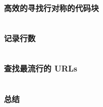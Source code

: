 \documentclass[./main.tex]{subfiles}
\begin{document}
%

\begin{lstlisting}[language=Haskell]

\end{lstlisting}



\begin{lstlisting}[language=Haskell]

\end{lstlisting}

\subsubsection*{高效的寻找行对称的代码块}


\begin{lstlisting}[language=Haskell]

\end{lstlisting}

\subsubsection*{记录行数}

%

\begin{lstlisting}[language=Haskell]

\end{lstlisting}

\subsubsection*{查找最流行的 URLs}

%

\begin{lstlisting}[language=Haskell]

\end{lstlisting}

\subsubsection*{总结}

%
\end{document}
